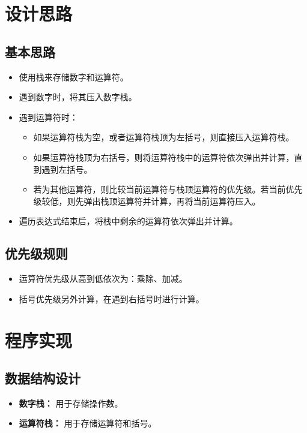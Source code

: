 \documentclass[UTF8]{ctexart}
\begin{document}
\pagestyle{fancy}
\fancyhead{}
\rhead{\today}

\section{设计思路}
\subsection{基本思路}
\begin{itemize}
    \item 使用栈来存储数字和运算符。
    \item 遇到数字时，将其压入数字栈。
    \item 遇到运算符时：
    \begin{itemize}
        \item 如果运算符栈为空，或者运算符栈顶为左括号，则直接压入运算符栈。
        \item 如果运算符栈顶为右括号，则将运算符栈中的运算符依次弹出并计算，直到遇到左括号。
        \item 若为其他运算符，则比较当前运算符与栈顶运算符的优先级。若当前优先级较低，则先弹出栈顶运算符并计算，再将当前运算符压入。
    \end{itemize}
    \item 遍历表达式结束后，将栈中剩余的运算符依次弹出并计算。
\end{itemize}

\subsection{优先级规则}
\begin{itemize}
    \item 运算符优先级从高到低依次为：乘除、加减。
    \item 括号优先级另外计算，在遇到右括号时进行计算。
\end{itemize}

\section{程序实现}
\subsection{数据结构设计}
\begin{itemize}
    \item \textbf{数字栈：} 用于存储操作数。
    \item \textbf{运算符栈：} 用于存储运算符和括号。
\end{itemize}
\end{document}
